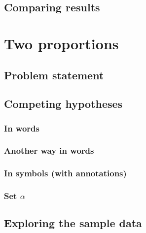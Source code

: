 \documentclass[12pt, krantz2,]{krantz}
\begin{document}
\hypertarget{comparing-results-1}{%
\subsection{Comparing results}\label{comparing-results-1}}

\hypertarget{two-proportions}{%
\section{Two proportions}\label{two-proportions}}

\hypertarget{problem-statement-2}{%
\subsection{Problem statement}\label{problem-statement-2}}

\hypertarget{competing-hypotheses-2}{%
\subsection{Competing hypotheses}\label{competing-hypotheses-2}}

\hypertarget{in-words-2}{%
\subsubsection*{In words}\label{in-words-2}}


\hypertarget{another-way-in-words}{%
\subsubsection*{Another way in words}\label{another-way-in-words}}


\hypertarget{in-symbols-with-annotations-2}{%
\subsubsection*{In symbols (with annotations)}\label{in-symbols-with-annotations-2}}


\hypertarget{set-alpha-2}{%
\subsubsection*{\texorpdfstring{Set \(\alpha\)}{Set \textbackslash{}alpha}}\label{set-alpha-2}}


\hypertarget{exploring-the-sample-data-2}{%
\subsection{Exploring the sample data}\label{exploring-the-sample-data-2}}
\end{document}
